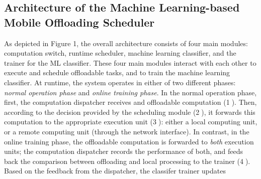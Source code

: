 \documentclass[10pt, conference, compsocconf]{IEEEtran}
\begin{document}
\subsection{Architecture of the Machine Learning-based Mobile Offloading
Scheduler}
%
As depicted in Figure 1, the overall architecture consists
of four main modules: computation switch, runtime scheduler, machine
learning classifier, and the trainer for the ML classifier.
%
These four main modules interact with each other to execute and
schedule offloadable tasks, and to train the machine learning
classifier. 
%
At runtime, the system operates in either of two different phases:
\textit{normal operation phase} and \textit{online training phase}.
%
In the normal operation phase, first, the computation dispatcher
receives and offloadable computation (\textcircled{1}).
%
Then, according to the decision provided by the scheduling module
(\textcircled{2}), it forwards this computation to the appropriate
execution unit (\textcircled{3}): either a local computing unit, or a
remote computing unit (through the network interface).
%
In contrast, in the online training phase, the offloadable
computation is forwarded to \textit{both} execution units; the
computation dispatcher records the performance of both, and feeds back
the comparison between offloading and local processing to the trainer
(\textcircled{4}).
%
Based on the feedback from the dispatcher, the classifer trainer updates
\end{document}
